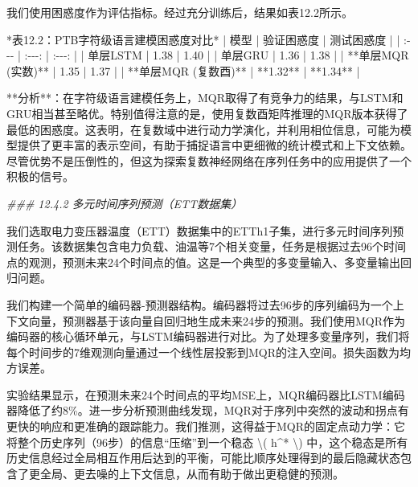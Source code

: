 \documentclass[
  12pt,
]{article}
\newenvironment{Shaded}{}{}
\newcommand{\CommentTok}[1]{\textcolor[rgb]{0.38,0.63,0.69}{\textit{#1}}}
\newcommand{\DecValTok}[1]{\textcolor[rgb]{0.25,0.63,0.44}{#1}}
\newcommand{\FloatTok}[1]{\textcolor[rgb]{0.25,0.63,0.44}{#1}}
\newcommand{\NormalTok}[1]{#1}
\newcommand{\OperatorTok}[1]{\textcolor[rgb]{0.40,0.40,0.40}{#1}}
\begin{document}
\begin{Shaded}
\begin{Highlighting}[]
\NormalTok{我们使用困惑度作为评估指标。经过充分训练后，结果如表}\FloatTok{12.2}\NormalTok{所示。}

\OperatorTok{*}\NormalTok{表}\FloatTok{12.2}\NormalTok{：PTB字符级语言建模困惑度对比}\OperatorTok{*}
\OperatorTok{|}\NormalTok{ 模型 }\OperatorTok{|}\NormalTok{ 验证困惑度 }\OperatorTok{|}\NormalTok{ 测试困惑度 }\OperatorTok{|}
\OperatorTok{|}\NormalTok{ :}\OperatorTok{{-}{-}{-}} \OperatorTok{|}\NormalTok{ :}\OperatorTok{{-}{-}{-}}\NormalTok{: }\OperatorTok{|}\NormalTok{ :}\OperatorTok{{-}{-}{-}}\NormalTok{: }\OperatorTok{|}
\OperatorTok{|}\NormalTok{ 单层LSTM }\OperatorTok{|} \FloatTok{1.38} \OperatorTok{|} \FloatTok{1.40} \OperatorTok{|}
\OperatorTok{|}\NormalTok{ 单层GRU }\OperatorTok{|} \FloatTok{1.36} \OperatorTok{|} \FloatTok{1.38} \OperatorTok{|}
\OperatorTok{|} \OperatorTok{**}\NormalTok{单层MQR (实数)}\OperatorTok{**} \OperatorTok{|} \FloatTok{1.35} \OperatorTok{|} \FloatTok{1.37} \OperatorTok{|}
\OperatorTok{|} \OperatorTok{**}\NormalTok{单层MQR (复数酉)}\OperatorTok{**} \OperatorTok{|} \OperatorTok{**}\FloatTok{1.32}\OperatorTok{**} \OperatorTok{|} \OperatorTok{**}\FloatTok{1.34}\OperatorTok{**} \OperatorTok{|}

\OperatorTok{**}\NormalTok{分析}\OperatorTok{**}\NormalTok{：在字符级语言建模任务上，MQR取得了有竞争力的结果，与LSTM和GRU相当甚至略优。特别值得注意的是，使用复数酉矩阵推理的MQR版本获得了最低的困惑度。这表明，在复数域中进行动力学演化，并利用相位信息，可能为模型提供了更丰富的表示空间，有助于捕捉语言中更细微的统计模式和上下文依赖。尽管优势不是压倒性的，但这为探索复数神经网络在序列任务中的应用提供了一个积极的信号。}

\CommentTok{\#\#\# 12.4.2 多元时间序列预测（ETT数据集）}

\NormalTok{我们选取电力变压器温度（ETT）数据集中的ETTh1子集，进行多元时间序列预测任务。该数据集包含电力负载、油温等}\DecValTok{7}\NormalTok{个相关变量，任务是根据过去}\DecValTok{96}\NormalTok{个时间点的观测，预测未来}\DecValTok{24}\NormalTok{个时间点的值。这是一个典型的多变量输入、多变量输出回归问题。}

\NormalTok{我们构建一个简单的编码器}\OperatorTok{{-}}\NormalTok{预测器结构。编码器将过去}\DecValTok{96}\NormalTok{步的序列编码为一个上下文向量，预测器基于该向量自回归地生成未来}\DecValTok{24}\NormalTok{步的预测。我们使用MQR作为编码器的核心循环单元，与LSTM编码器进行对比。为了处理多变量序列，我们将每个时间步的}\DecValTok{7}\NormalTok{维观测向量通过一个线性层投影到MQR的注入空间。损失函数为均方误差。}

\NormalTok{实验结果显示，在预测未来}\DecValTok{24}\NormalTok{个时间点的平均MSE上，MQR编码器比LSTM编码器降低了约}\DecValTok{8}\OperatorTok{\%}\NormalTok{。进一步分析预测曲线发现，MQR对于序列中突然的波动和拐点有更快的响应和更准确的跟踪能力。我们推测，这得益于MQR的固定点动力学：它将整个历史序列（}\DecValTok{96}\NormalTok{步）的信息“压缩”到一个稳态 }\OperatorTok{\textbackslash{}}\NormalTok{( h}\OperatorTok{\^{}*} \OperatorTok{\textbackslash{}}\NormalTok{) 中，这个稳态是所有历史信息经过全局相互作用后达到的平衡，可能比顺序处理得到的最后隐藏状态包含了更全局、更去噪的上下文信息，从而有助于做出更稳健的预测。}


\end{Highlighting}
\end{Shaded}
\end{document}
